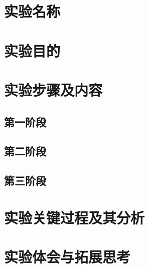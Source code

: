 \documentclass{whureport}
\title{\homeworkname}
\date{}
\begin{document}
\makecover

\section{实验名称}




\section{实验目的}



\section{实验步骤及内容}
\subsection{第一阶段}





\subsection{第二阶段}




\subsection{第三阶段}





\section{实验关键过程及其分析}





\section{实验体会与拓展思考}
\end{document}
